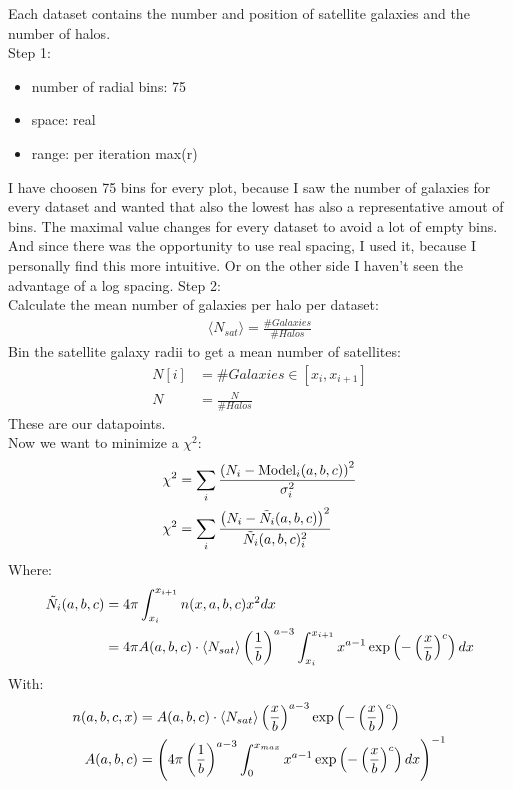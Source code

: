Each dataset contains the number and position of satellite galaxies and the number of halos.\\
Step 1:\\
\begin{itemize}
    \item number of radial bins: 75
    \item space: real
    \item range: per iteration max(r)
\end{itemize}
I have choosen 75 bins for every plot, because I saw the number of galaxies for every dataset and wanted that also the lowest has also a representative amout of bins. The maximal value changes for every dataset to avoid a lot of empty bins. And since there was the opportunity to use real spacing, I used it, because I personally find this more intuitive. Or on the other side I haven't seen the advantage of a log spacing. 
Step 2: \\
Calculate the mean number of galaxies per halo per dataset:
\begin{align}
    \langle N_{sat} \rangle = \frac{\# Galaxies}{\# Halos}
\end{align}
Bin the satellite galaxy radii to get a mean number of satellites:
\begin{align}
    N[i] &= \# Galaxies \in [x_i,x_{i+1}]\\
    N &= \frac{N}{\# Halos}
\end{align}
These are our datapoints. \\
Now we want to minimize a $\chi^2$:
\begin{align}
    \chi^2 &= \sum_i \frac{\left({N_i-\text{Model}_i(a,b,c)}\right)^2}{\sigma_i^2}\\
    \chi^2 &= \sum_i \frac{\left({N_i-\Tilde{N}_i(a,b,c)}\right)^2}{\Tilde{N}_i(a,b,c)_i^2}
\end{align}
Where:
\begin{align}
    \Tilde{N}_i(a,b,c) &= 4 \pi \int_{x_i}^{x_{i+1}}n(x,a,b,c)x^2dx \\
    &= 4 \pi A(a,b,c)\cdot \langle N_{sat} \rangle \left( \frac{1}{b} \right)^{a-3}  \int_{x_i}^{x_{i+1}}x^{a-1} \exp\left({-\left( \frac{x}{b} \right)^{c}}\right) dx
\end{align}
With:
\begin{align}
    n(a,b,c,x) &= A(a,b,c)\cdot \langle N_{sat} \rangle \left( \frac{x}{b} \right)^{a-3} \exp\left({-\left( \frac{x}{b} \right)^{c}}\right)\\
    A(a,b,c) &= \left({4\pi \left( \frac{1}{b} \right)^{a-3} \int_0^{x_{max}} x^{a-1} \exp\left({-\left( \frac{x}{b} \right)^c}\right) dx}\right)^{-1}
\end{align}

